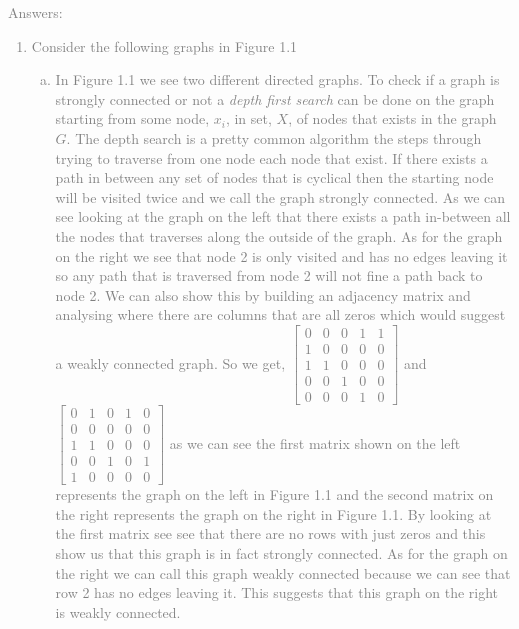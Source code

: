 \documentclass[11pt]{article}
\begin{document}
\textcolor{gray}{
Answers:
\begin{enumerate}
	\item Consider the following graphs in Figure 1.1
	\begin{enumerate}[(a)]
		\item In Figure 1.1 we see two different directed graphs.  To check if a graph is strongly connected or not a \textit{depth first search} can be done on the graph starting from some node, $x_i$, in set, $X$, of nodes that exists in the graph $G$.  The depth search is a pretty common algorithm the steps through trying to traverse from one node each node that exist. If there exists a path in between any set of nodes that is cyclical then the starting node will be visited twice and we call the graph strongly connected.  As we can see looking at the graph on the left that there exists a path in-between all the nodes that traverses along the outside of the graph.  As for the graph on the right we see that node 2 is only visited and has no edges leaving it so any path that is traversed from node 2 will not fine a path back to node 2.  We can also show this by building an adjacency matrix and analysing where there are columns that are all zeros which would suggest a weakly connected graph.  So we get,
		$\begin{bmatrix} 
			0  & 0  & 0 & 1 & 1 \\
			1  & 0  & 0 & 0 & 0 \\
			1  & 1  & 0 & 0 & 0 \\
			0  & 0  & 1 & 0 & 0 \\
			0  & 0  & 0 & 1 & 0 
		\end{bmatrix}$
and 
		$\begin{bmatrix} 
			0 & 1 & 0 & 1 & 0 \\
			0 & 0 & 0 & 0 & 0 \\
			1 & 1 & 0 & 0 & 0 \\
			0 & 0 & 1 & 0 & 1 \\
			1 & 0 & 0 & 0 & 0 
		\end{bmatrix}$
 as we can see the first matrix shown on the left represents the graph on the left in Figure 1.1 and the second matrix on the right represents the graph on the right in Figure 1.1.  By looking at the first matrix see see that there are no rows with just zeros and this show us that this graph is in fact strongly connected.  As for the graph on the right we can call this graph weakly connected because we can see that row 2 has no edges leaving it.  This suggests that this graph on the right is weakly connected. 

\end{enumerate}
\end{enumerate}}
\end{document}
